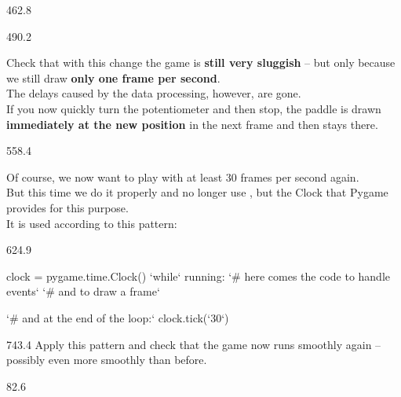 \documentclass{aslab}
\newcommand*\Kw[1]{\textcolor{codeorange}{#1}}  %
\newcommand*\Nu[1]{\textcolor{codered}{#1}}     %
\newcommand*\Bl[1]{\textcolor{aslabblue}{#1}}   %
\begin{document}
\begin{region}{462.8}
\end{region}

\begin{region}[pitch=13.73]{490.2}
\begin{tasks}
\item Check that with this change the game is \textbf{still very sluggish}
  -- but only because we still draw \textbf{only one frame per second}.\\
  The delays caused by the data processing, however, are gone.\\
  If you now quickly turn the potentiometer and then stop, the paddle is
  drawn \textbf{immediately at the new position} in the next frame and then
  stays there.
\end{tasks}
\end{region}

\begin{region}[pitch=13.3]{558.4}
\begin{tasks}[start=2]
\item Of course, we now want to play with at least 30 frames per second
  again.\\
  But this time we do it properly and no longer use ,
  but the Clock that Pygame provides for this purpose.\\
  It is used according to this pattern:
\end{tasks}
\end{region}

\begin{region}[x=74.7,right=0,pitch=13.2]{624.9}
\begin{codeblock}[escapechar=`]
clock = pygame.time.Clock()
`\Kw{while}` running:
    `\Bl{\# here comes the code to handle events}`
    `\Bl{\# and to draw a frame}`

    `\Bl{\# and at the end of the loop:}`
    clock.tick(`\Nu{30}`)
\end{codeblock}
\end{region}

\begin{region}[x=74.7,right=0,pitch=13.1]{743.4}
Apply this pattern and check that the game now runs smoothly again --
possibly even more smoothly than before.
\end{region}

\nextpage
\begin{region}[x=74.7,right=0]{82.6}
\end{region}
\end{document}
